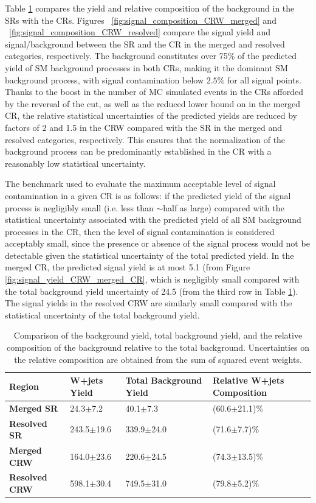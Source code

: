Table \ref{tab:Wjets_composition_CRW} compares the yield and relative composition of the \wjets background in the SRs with the \wjets CRs. Figures ~\ref{fig:signal_composition_CRW_merged} and ~\ref{fig:signal_composition_CRW_resolved} compare the signal yield and signal/background between the SR and the \wjets CR in the merged and resolved categories, respectively. The \wjets background constitutes over 75\% of the predicted yield of SM background processes in both CRs, making it the dominant SM background process, with signal contamination below \(2.5\%\) for all signal points. Thanks to the boost in the number of MC simulated events in the CRs afforded by the reversal of the \DeltaR cut, as well as the reduced lower bound on \metsig in the merged CR, the relative statistical uncertainties of the predicted \wjets yields are reduced by factors of 2 and 1.5 in the CRW compared with the SR in the merged and resolved categories, respectively. This ensures that the normalization of the \wjets background process can be predominantly established in the \wjets CR with a reasonably low statistical uncertainty. 

The benchmark used to evaluate the maximum acceptable level of signal contamination in a given CR is as follows: if the predicted yield of the signal process is negligibly small (i.e. less than \(\sim\)half as large) compared with the statistical uncertainty associated with the predicted yield of all SM background processes in the CR, then the level of signal contamination is considered acceptably small, since the presence or absence of the signal process would not be detectable given the statistical uncertainty of the total predicted yield. In the merged \wjets CR, the predicted signal yield is at most 5.1 (from Figure \ref{fig:signal_yield_CRW_merged_CR}, which is negligibly small compared with the total background yield uncertainty of 24.5 (from the third row in Table \ref{tab:Wjets_composition_CRW}). The signal yields in the resolved CRW are similarly small compared with the statistical uncertainty of the total background yield.

\begin{table}[ht]
 \centering
 \footnotesize{
\caption{\label{tab:Wjets_composition_CRW} Comparison of the \wjets background yield, total background yield, and the relative composition of the \wjets background relative to the total background. Uncertainties on the relative composition are obtained from the sum of squared event weights.}
\begin{tabular}{l l l l}
\toprule
\textbf{Region} & \textbf{W+jets Yield} & \textbf{Total Background Yield} & \textbf{Relative W+jets Composition}\tabularnewline
\midrule
\midrule
\textbf{Merged SR} & 24.3\(\pm\)7.2 & 40.1\(\pm\)7.3 & (60.6\(\pm\)21.1)\%  \tabularnewline
\midrule
\textbf{Resolved SR} & 243.5\(\pm\)19.6 & 339.9\(\pm\)24.0 & (71.6\(\pm\)7.7)\% \tabularnewline
\midrule
\textbf{Merged CRW} & 164.0\(\pm\)23.6 & 220.6\(\pm\)24.5 & (74.3\(\pm\)13.5)\% \tabularnewline
\midrule
\textbf{Resolved CRW} & 598.1\(\pm\)30.4 & 749.5\(\pm\)31.0 & (79.8\(\pm\)5.2)\% \tabularnewline
\bottomrule
\end{tabular}}
\end{table}

